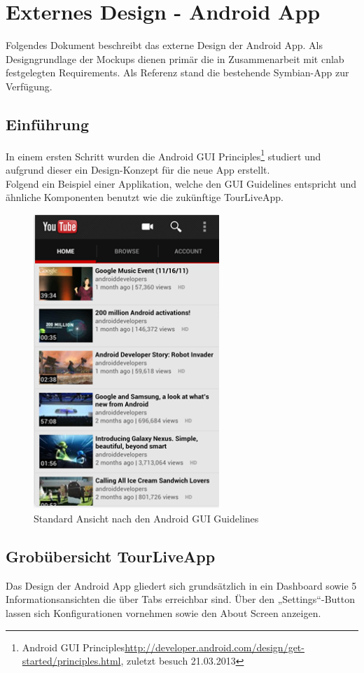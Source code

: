 \section{Externes Design - Android App}

Folgendes Dokument beschreibt das externe Design der Android App. Als Designgrundlage der Mockups dienen primär die in Zusammenarbeit mit cnlab festgelegten Requirements. Als Referenz stand die bestehende Symbian-App zur Verfügung. 

\subsection{Einführung}

In einem ersten Schritt wurden die Android GUI Principles\footnote{Android GUI Principles\url{http://developer.android.com/design/get-started/principles.html}, zuletzt besuch 21.03.2013}  studiert und aufgrund dieser ein Design-Konzept für die neue App erstellt. \\

Folgend ein Beispiel einer Applikation, welche den GUI Guidelines entspricht und ähnliche Komponenten benutzt wie die zukünftige TourLiveApp.


\begin{figure}[H]
	\centering\includegraphics[width=70mm]{images/android/mockups/androidexample.png} 
	\caption{Standard Ansicht nach den Android GUI Guidelines}
\end{figure}


\subsection{Grobübersicht TourLiveApp}
Das Design der Android App gliedert sich grundsätzlich in ein Dashboard sowie 5 Informationsansichten die über Tabs erreichbar sind. Über den „Settings“-Button lassen sich Konfigurationen vornehmen sowie den About Screen anzeigen.

